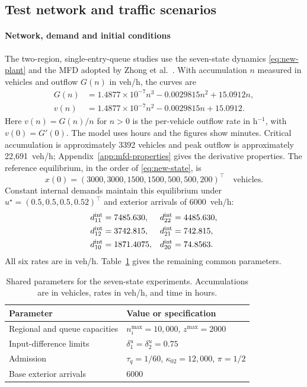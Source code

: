 \documentclass[final]{cas-sc}
\theoremstyle{definition}
\theoremstyle{plain}
\theoremstyle{definition}
\theoremstyle{plain}
\newcommand{\appref}[1]{Appendix~\ref{#1}}
\begin{document}
\subsection{Test network and traffic scenarios}
\label{sec:experimental-setup}

\paragraph{Network, demand and initial conditions}
The two-region, single-entry-queue studies use the seven-state dynamics \eqref{eq:new-plant}
and the MFD adopted by Zhong et al.~\cite{zhong2018robust}. With
accumulation $n$ measured in vehicles and outflow $G(n)$ in veh/h,
the curves are
\begin{equation}
\begin{aligned}
G(n)&=1.4877\times10^{-7}n^3-0.0029815n^2+15.0912n,\\
v(n)&=1.4877\times10^{-7}n^2-0.0029815n+15.0912.
\end{aligned}
\label{eq:new-mfd}
\end{equation}
Here $v(n)=G(n)/n$ for $n>0$ is the per-vehicle outflow rate in
h$^{-1}$, with $v(0)=G'(0)$.
The model uses hours and the figures show minutes. Critical accumulation
is approximately 3392 vehicles and peak outflow is approximately
22,691~veh/h; \appref{app:mfd-properties} gives the derivative properties.
The reference equilibrium, in the order of \eqref{eq:new-state}, is
\[
x(0)=(3000,3000,1500,1500,500,500,200)^\top\quad\text{vehicles}.
\]
Constant internal demands maintain this equilibrium under
$u^\star=(0.5,0.5,0.5,0.52)^\top$ and exterior arrivals of 6000~veh/h:
\begin{equation}
\begin{aligned}
d_{11}^{\rm int}&=7485.630,  & d_{22}^{\rm int}&=4485.630,\\
d_{12}^{\rm int}&=3742.815,  & d_{21}^{\rm int}&=742.815,\\
d_{10}^{\rm int}&=1871.4075, & d_{20}^{\rm int}&=74.8563.
\end{aligned}
\label{eq:new-incident-demands}
\end{equation}
All six rates are in veh/h. Table~\ref{tab:experiment-parameters} gives
the remaining common parameters.
\begin{table}[pos=!htb]
\centering\small
\caption{Shared parameters for the seven-state experiments. Accumulations
are in vehicles, rates in veh/h, and time in hours.}
\label{tab:experiment-parameters}
\begin{tabularx}{\linewidth}{@{}lX@{}}
\toprule
Parameter & Value or specification\\
\midrule
Regional and queue capacities & $n_i^{\max}=10{,}000$, $z^{\max}=2000$\\
Input-difference limits & $\delta_1^u=\delta_2^u=0.75$\\
Admission & $\tau_q=1/60$, $\kappa_{02}=12{,}000$, $\pi=1/2$\\
Base exterior arrivals & $6000$\\
\bottomrule
\end{tabularx}
\end{table}
\end{document}
